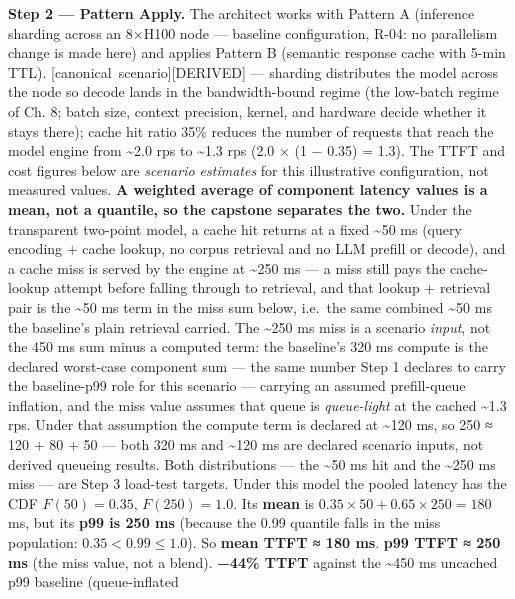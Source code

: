 \textbf{Step 2 --- Pattern Apply.} The architect works with Pattern A
(inference sharding across an 8×H100 node --- baseline configuration,
R-04: no parallelism change is made here) and applies Pattern B
(semantic response cache with 5-min TTL). \mbox{{[}canonical
scenario{]}}\hspace{0pt}\mbox{{[}DERIVED{]}} --- sharding distributes the model across the
node so decode lands in the bandwidth-bound regime (the low-batch regime
of Ch. 8; batch size, context precision, kernel, and hardware decide
whether it stays there); cache hit ratio 35\% reduces the number of
requests that reach the model engine from \textasciitilde2.0 rps to
\textasciitilde1.3 rps (2.0 × (1 − 0.35) = 1.3). The TTFT and cost
figures below are \emph{scenario estimates} for this illustrative
configuration, not measured values. \textbf{A weighted average of
component latency values is a mean, not a quantile, so the capstone
separates the two.} Under the transparent two-point model, a cache hit
returns at a fixed \textasciitilde50 ms (query encoding + cache lookup,
no corpus retrieval and no LLM prefill or decode), and a cache miss is
served by the engine at \textasciitilde250 ms --- a miss still pays the
cache-lookup attempt before falling through to retrieval, and that
lookup + retrieval pair is the \textasciitilde50 ms term in the miss sum
below, i.e.~the same combined \textasciitilde50 ms the baseline's plain
retrieval carried. The \textasciitilde250 ms miss is a scenario
\emph{input}, not the 450 ms sum minus a computed term: the baseline's
320 ms compute is the declared worst-case component sum --- the same
number Step 1 declares to carry the baseline-p99 role for this scenario
--- carrying an assumed prefill-queue inflation, and the miss value
assumes that queue is \emph{queue-light} at the cached
\textasciitilde1.3 rps. Under that assumption the compute term is
declared at \textasciitilde120 ms, so 250 ≈ 120 + 80 + 50 --- both 320
ms and \textasciitilde120 ms are declared scenario inputs, not derived
queueing results. Both distributions --- the \textasciitilde50 ms hit
and the \textasciitilde250 ms miss --- are Step 3 load-test targets.
Under this model the pooled latency has the CDF \(F(50)=0.35\),
\(F(250)=1.0\). Its \textbf{mean} is
\(0.35\times50 + 0.65\times250 = 180\) ms, but its \textbf{p99 is 250
ms} (because the 0.99 quantile falls in the miss population:
\(0.35 < 0.99 \le 1.0\)). So \textbf{mean TTFT ≈ 180 ms}. \textbf{p99
TTFT ≈ 250 ms} (the miss value, not a blend). \textbf{−44\% TTFT}
against the \textasciitilde450 ms uncached p99 baseline (queue-inflated
